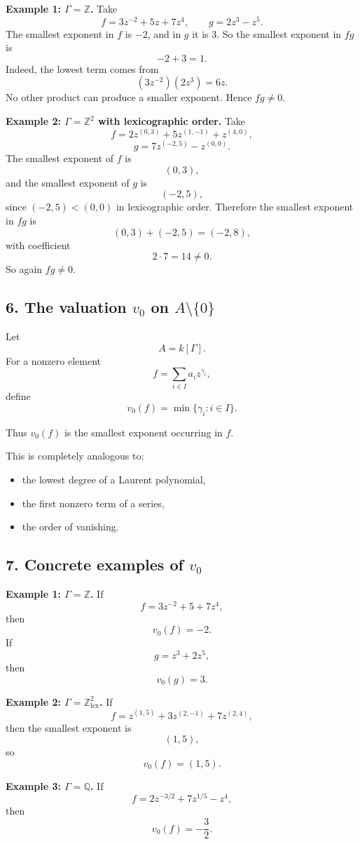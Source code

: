 \documentclass[12pt,a4paper]{article}
\theoremstyle{notespace}
\begin{document}
\textbf{Example 1: \(\Gamma=\mathbb Z\).}
Take
\[
f=3z^{-2}+5z+7z^4,
\qquad
g=2z^3-z^5.
\]
The smallest exponent in \(f\) is \(-2\), and in \(g\) it is \(3\). So the smallest exponent in \(fg\) is
\[
-2+3=1.
\]
Indeed, the lowest term comes from
\[
(3z^{-2})(2z^3)=6z.
\]
No other product can produce a smaller exponent. Hence \(fg\neq 0\).

\textbf{Example 2: \(\Gamma=\mathbb Z^2\) with lexicographic order.}
Take
\[
f = 2z^{(0,3)} + 5z^{(1,-1)} + z^{(4,0)},
\]
\[
g = 7z^{(-2,5)} - z^{(0,0)}.
\]
The smallest exponent of \(f\) is
\[
(0,3),
\]
and the smallest exponent of \(g\) is
\[
(-2,5),
\]
since \((-2,5)<(0,0)\) in lexicographic order. Therefore the smallest exponent in \(fg\) is
\[
(0,3)+(-2,5)=(-2,8),
\]
with coefficient
\[
2\cdot 7=14\neq 0.
\]
So again \(fg\neq 0\).

\subsection{6. The valuation \(v_0\) on \(A\setminus\{0\}\)}

Let
\[
A=k[\Gamma].
\]
For a nonzero element
\[
f=\sum_{i\in I} a_i z^{\gamma_i},
\]
define
\[
v_0(f)=\min\{\gamma_i : i\in I\}.
\]

Thus \(v_0(f)\) is the smallest exponent occurring in \(f\).

This is completely analogous to:
\begin{itemize}
	\item the lowest degree of a Laurent polynomial,
	\item the first nonzero term of a series,
	\item the order of vanishing.
\end{itemize}

\subsection{7. Concrete examples of \(v_0\)}

\textbf{Example 1: \(\Gamma=\mathbb Z\).}
If
\[
f=3z^{-2}+5+7z^4,
\]
then
\[
v_0(f)=-2.
\]
If
\[
g=z^3+2z^5,
\]
then
\[
v_0(g)=3.
\]

\textbf{Example 2: \(\Gamma=\mathbb Z^2_{\mathrm{lex}}\).}
If
\[
f=z^{(1,5)}+3z^{(2,-1)}+7z^{(2,4)},
\]
then the smallest exponent is
\[
(1,5),
\]
so
\[
v_0(f)=(1,5).
\]

\textbf{Example 3: \(\Gamma=\mathbb Q\).}
If
\[
f=2z^{-3/2}+7z^{1/5}-z^4,
\]
then
\[
v_0(f)=-\frac32.
\]
\end{document}
